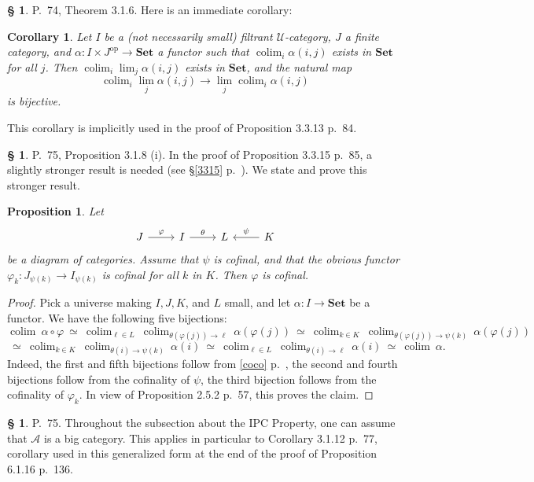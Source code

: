 \documentclass[12pt]{article}%
\newtheorem{prop}[thm]{Proposition}
\newtheorem{cor}[thm]{Corollary}
\theoremstyle{remark}
\theoremstyle{definition}
\newtheorem{s}[thm]{\S}%
\newcommand{\A}{\mathcal A}
\newcommand{\U}{\mathcal U}
\newcommand{\Set}{\mathbf{Set}}
\DeclareMathOperator*{\colim}{colim}
\DeclareMathOperator{\op}{op}
\begin{document}
%

\begin{s} 
P.~74, Theorem 3.1.6. Here is an immediate corollary: 
%
\begin{cor}\label{316}
Let $I$ be a (not necessarily small) filtrant $\U$-category, $J$ a finite category, and $\alpha:I\times J^{\op}\to\Set$ a functor such that $\colim_i\alpha(i,j)$ exists in $\Set$ for all $j$. Then $\colim_i\lim_j\alpha(i,j)$ exists in $\Set$, and the natural map 
$$
\colim_i\lim_j\alpha(i,j)\to
\lim_j\colim_i\alpha(i,j)
$$ 
is bijective. 
\end{cor}
%
This corollary is implicitly used in the proof of Proposition 3.3.13 p.~84.
\end{s}

%

\begin{s} 
P.~75, Proposition 3.1.8 (i). In the proof of Proposition 3.3.15 p.~85, a slightly stronger result is needed (see \S\ref{3315} p.~\pageref{3315}). We state and prove this stronger result. 
%
\begin{prop}\label{318i} 
%
Let 
$$
\begin{tikzcd}
J\ar{r}{\varphi}&I\ar{r}{\theta}&L&K\ar{l}[swap]{\psi}
\end{tikzcd}
$$
be a diagram of categories. Assume that $\psi$ is cofinal, and that the obvious functor $\varphi_k:J_{\psi(k)}\to I_{\psi(k)}$ is cofinal for all $k$ in $K$. Then $\varphi$ is cofinal. 
%
\end{prop} 
%
\begin{proof}
Pick a universe making $I,J,K$, and $L$ small, and let $\alpha:I\to\Set$ be a functor. We have the following five bijections:
$$
\colim\ \alpha\circ\varphi\ \simeq\ 
%
\colim_{\ell\in L}\ \colim_{\theta(\varphi(j))\to\ell}\ \alpha(\varphi(j))\ \simeq\ 
%
\colim_{k\in K}\ \colim_{\theta(\varphi(j))\to\psi(k)}\ \alpha(\varphi(j))
$$
$$
\ \simeq\ \colim_{k\in K}\ \colim_{\theta(i)\to\psi(k)}\ \alpha(i)\ \simeq\ 
%
\colim_{\ell\in L}\ \colim_{\theta(i)\to\ell}\ \alpha(i)\ \simeq\ 
%
\colim\ \alpha.
$$
Indeed, the first and fifth bijections follow from \eqref{coco} p.~\pageref{coco}, the second and fourth bijections follow from the cofinality of $\psi$, the third bijection follows from the cofinality of $\varphi_k$. In view of Proposition 2.5.2 p.~57, this proves the claim.
\end{proof}
\end{s}

%

\begin{s}\label{cipc}
P.~75. Throughout the subsection about the IPC Property, one can assume that $\A$ is a big category. This applies in particular to Corollary 3.1.12 p.~77, corollary used in this generalized form at the end of the proof of Proposition 6.1.16 p.~136.
\end{s}
\end{document}
